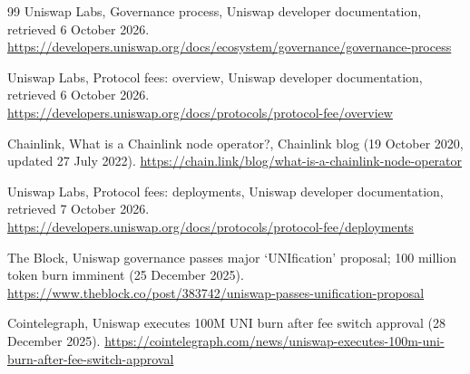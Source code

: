 \begin{thebibliography}{99}
{Uniswap Labs}, Governance process, Uniswap developer documentation,
retrieved 6 October 2026.
\newline\urlprefix\url{https://developers.uniswap.org/docs/ecosystem/governance/governance-process}

{Uniswap Labs}, Protocol fees: overview, Uniswap developer documentation,
retrieved 6 October 2026.
\newline\urlprefix\url{https://developers.uniswap.org/docs/protocols/protocol-fee/overview}

{Chainlink}, What is a Chainlink node operator?, Chainlink blog (19 October
2020, updated 27 July 2022).
\newline\urlprefix\url{https://chain.link/blog/what-is-a-chainlink-node-operator}

{Uniswap Labs}, Protocol fees: deployments, Uniswap developer documentation,
retrieved 7 October 2026.
\newline\urlprefix\url{https://developers.uniswap.org/docs/protocols/protocol-fee/deployments}

{The Block}, Uniswap governance passes major `UNIfication' proposal; 100
million token burn imminent (25 December 2025).
\newline\urlprefix\url{https://www.theblock.co/post/383742/uniswap-passes-unification-proposal}

{Cointelegraph}, Uniswap executes 100M UNI burn after fee switch approval (28
December 2025).
\newline\urlprefix\url{https://cointelegraph.com/news/uniswap-executes-100m-uni-burn-after-fee-switch-approval}

\end{thebibliography}
